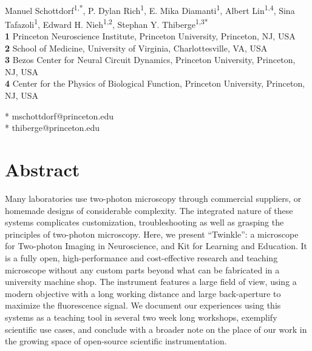 \documentclass[10pt,letterpaper]{article}
\begin{document}
\vspace*{0.2in}

\begin{flushleft}
{\Large
\textbf{}
}
\newline
\\
Manuel Schottdorf\textsuperscript{1,*}, %
P. Dylan Rich\textsuperscript{1}, %
E. Mika Diamanti\textsuperscript{1}, %
Albert Lin\textsuperscript{1,4}, %
Sina Tafazoli\textsuperscript{1}, %
Edward H. Nieh\textsuperscript{1,2}, %
Stephan Y. Thiberge\textsuperscript{1,3*} %
\\
\bigskip
\textbf{1} Princeton Neuroscience Institute, Princeton University, Princeton, NJ, USA\\
\textbf{2} School of Medicine, University of Virginia, Charlottesville, VA, USA \\
\textbf{3} Bezos Center for Neural Circuit Dynamics, Princeton University, Princeton, NJ, USA\\
\textbf{4} Center for the Physics of Biological Function, Princeton University, Princeton, NJ, USA\\
\bigskip

* mschottdorf@princeton.edu\\
* thiberge@princeton.edu

\end{flushleft}
\section*{Abstract}
Many laboratories use two-photon microscopy through commercial suppliers, or homemade designs of considerable complexity. The integrated nature of these systems complicates customization, troubleshooting as well as grasping the principles of two-photon microscopy. Here, we present ``Twinkle'': a microscope for Two-photon Imaging in Neuroscience, and Kit for Learning and Education. It is a fully open, high-performance and cost-effective research and teaching microscope without any custom parts beyond what can be fabricated in a university machine shop. The instrument features a large field of view, using a modern objective with a long working distance and large back-aperture to maximize the fluorescence signal. We document our experiences using this systems as a teaching tool in several two week long workshops, exemplify scientific use cases, and conclude with a broader note on the place of our work in the growing space of open-source scientific instrumentation.
\end{document}
